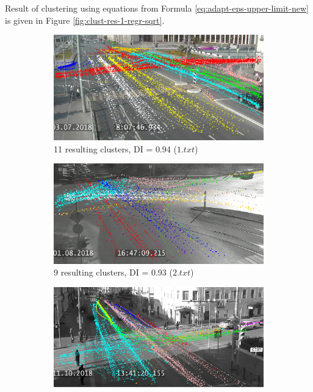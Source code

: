 Result of clustering using equations from Formula \ref{eq:adapt-eps-upper-limit-new} is given in Figure \ref{fig:clust-res-1-regr-sqrt}.

\begin{figure}[!htb]
	\centering
	\begin{subfigure}[!htb]{0.23\textwidth}
		\centering{}
		\includegraphics[width=\textwidth]{images/cl-res/clust-res-1-regr-sqrt-1.png}
		\caption{11 resulting clusters, DI = 0.94 ($1.txt$)}
		\label{fig:clust-res-1-regr-sqrt-1}
	\end{subfigure}
	\hfill
	\begin{subfigure}[!htb]{0.23\textwidth}
		\centering{}
		\includegraphics[width=\textwidth]{images/cl-res/clust-res-1-regr-sqrt-2.png}
		\caption{9 resulting clusters, DI = 0.93 ($2.txt$)}
		\label{fig:clust-res-1-regr-sqrt-2}
	\end{subfigure}
	\hfill
	\begin{subfigure}[!htb]{0.23\textwidth}
		\centering{}
		\includegraphics[width=\textwidth]{images/cl-res/clust-res-1-regr-sqrt-3.png}

\end{subfigure}
\end{figure}
